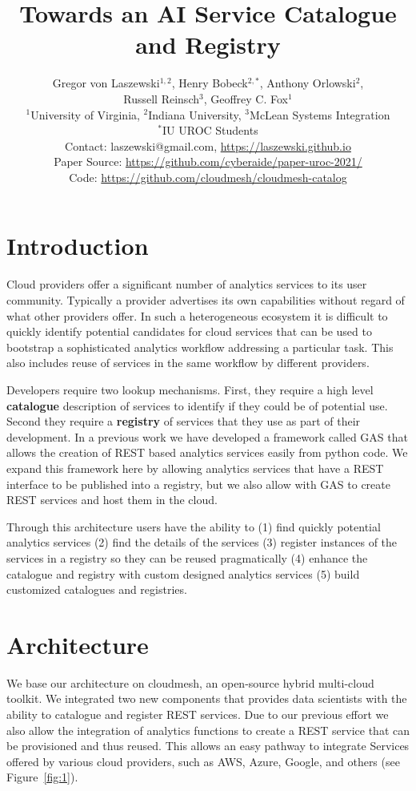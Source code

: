 \documentclass[fullpage,12pt]{article}
\date{}
\title{Towards an AI Service Catalogue and Registry}
\author{Gregor von Laszewski$^{1,2}$,
Henry Bobeck$^{2,*}$,
Anthony Orlowski$^2$,\\
Russell Reinsch$^3$,
Geoffrey C. Fox$^1$\\
\footnotesize $^1$University of Virginia, 
$^2$Indiana University,
\footnotesize $^3$McLean Systems Integration\\
\footnotesize $^*$IU UROC Students \\
{
\footnotesize Contact: laszewski@gmail.com, \url{https://laszewski.github.io}\\
\footnotesize Paper Source: \url{https://github.com/cyberaide/paper-uroc-2021/}\\
\footnotesize Code: \url{https://github.com/cloudmesh/cloudmesh-catalog}}
}
\begin{document}
\maketitle

\section{Introduction}

Cloud providers offer a significant number of analytics services to its user community. Typically a provider advertises its own capabilities without regard of what other providers offer. In such a heterogeneous ecosystem it is difficult to quickly identify potential candidates for cloud services that can be used to bootstrap a sophisticated analytics workflow addressing a particular task. This also includes reuse of services in the same workflow by different providers. 

Developers require two lookup mechanisms. First, they require a high level {\bf catalogue} description of services to identify if they could be of potential use. Second they require a {\bf registry} of services that they use as part of their development. In a previous work we have developed a framework called GAS \cite{las-2021-gas} that allows the creation of REST based analytics services easily from python code. We expand this framework here by allowing analytics services that have a REST interface to be published into a registry, but we also allow with GAS to create REST services and host them in the cloud. 

Through this architecture users have the ability to 
(1) find quickly potential analytics services (2) find the details of the services (3) register instances of the services in a registry so they can be reused pragmatically  (4) enhance the catalogue and registry with custom designed analytics services (5) build customized catalogues and registries.

\section{Architecture}

We base our architecture on cloudmesh, an open-source hybrid multi-cloud toolkit. We integrated two new components that provides data scientists with the ability to catalogue and register REST services. Due to our previous effort we also allow the integration of analytics functions to create a REST service that can be provisioned and thus reused. This allows an easy pathway to integrate Services offered by various cloud providers, such as AWS, Azure, Google, and others (see Figure~\ref{fig:1}).  
\end{document}
